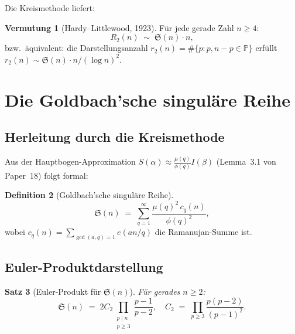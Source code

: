 \documentclass[12pt,a4paper]{amsart}
\newtheorem{theorem}{Satz}[section]
\theoremstyle{definition}
\newtheorem{definition}[theorem]{Definition}
\newtheorem{vermutung}[theorem]{Vermutung}
\newcommand{\eq}[1]{e\!\left(#1\right)}
\begin{document}
Die Kreismethode liefert:

\begin{vermutung}[Hardy--Littlewood, 1923]\label{verm:HL}
  Für jede gerade Zahl $n \geq 4$:
  \[
    R_2(n) \;\sim\; \mathfrak{S}(n) \cdot n,
  \]
  bzw.\ äquivalent: die Darstellungsanzahl $r_2(n) = \#\{p : p, n-p \in \mathbb{P}\}$
  erfüllt $r_2(n) \sim \mathfrak{S}(n) \cdot n / (\log n)^2$.
\end{vermutung}

\section{Die Goldbach'sche singuläre Reihe}
\label{sec:singulaerreihe}

\subsection{Herleitung durch die Kreismethode}

Aus der Hauptbogen-Approximation $S(\alpha) \approx \frac{\mu(q)}{\phi(q)} I(\beta)$
(Lemma~3.1 von Paper~18) folgt formal:

\begin{definition}[Goldbach'sche singuläre Reihe]\label{def:sing}
  \[
    \mathfrak{S}(n)
    \;=\; \sum_{q=1}^{\infty} \frac{\mu(q)^2\, c_q(n)}{\phi(q)^2},
  \]
  wobei $c_q(n) = \sum_{\gcd(a,q)=1} \eq{an/q}$ die Ramanujan-Summe ist.
\end{definition}

\subsection{Euler-Produktdarstellung}

\begin{theorem}[Euler-Produkt für $\mathfrak{S}(n)$]\label{thm:euler}
  Für gerades $n \geq 2$:
  \[
    \mathfrak{S}(n)
    \;=\; 2 C_2 \prod_{\substack{p \mid n \\ p \geq 3}} \frac{p-1}{p-2},
    \quad
    C_2 \;=\; \prod_{p \geq 3} \frac{p(p-2)}{(p-1)^2}.
  \]
\end{theorem}
\end{document}
